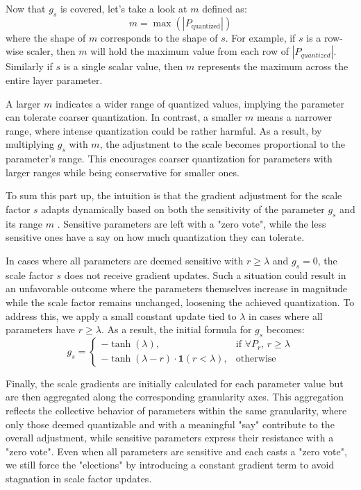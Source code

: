 Now that \( g_s \) is covered, let's take a look at \( m \) defined as:
\[
m = \max\left(\left| P_{\text{quantized}} \right|\right) 
\]
where the shape of \( m \) corresponds to the shape of \( s \).
For example, if \( s \) is a row-wise scaler, then \( m  \) will hold
the maximum value from each row of \( \left| P_{quantized} \right|\).
Similarly if  \( s \) is a single scalar value, then \( m \) represents
the maximum across the entire layer parameter.

A larger \( m \) indicates a wider range of quantized values,
implying the parameter can tolerate coarser quantization.
In contrast, a smaller \( m \) means a narrower range,
where intense quantization could be rather harmful.
As a result, by multiplying \( g_s\) with \( m \), 
the adjustment to the scale becomes proportional to the parameter's range.
This encourages coarser quantization for parameters with larger ranges
while being conservative for smaller ones.

To sum this part up, the intuition is that the gradient adjustment for the scale factor
\( s \) adapts dynamically based on both the sensitivity of the parameter  \( g_s\) 
and its range \( m \) . Sensitive parameters are left with a "zero vote",
while the less sensitive ones have a say on how much quantization they can tolerate.

In cases where all parameters are deemed sensitive with \( r \geq \lambda\) and
\( g_s =  0 \), the scale factor \(s\) does not receive gradient updates.
Such a situation could result in an unfavorable outcome
where the parameters themselves increase in magnitude while the scale factor remains unchanged,
loosening the achieved quantization.
To address this, we apply a small constant update tied to \( \lambda \) in cases where 
all parameters have \( r \geq \lambda\). As a result, the initial formula for \( g_s\) becomes:
\[
g_s = 
\begin{cases} 
- \tanh(\lambda), & \text{if } \forall P_r, \, r \geq \lambda \\
- \tanh(\lambda - r) \cdot \mathbf{1}(r < \lambda), & \text{otherwise}
\end{cases}
\]

Finally, the scale gradients are initially calculated for each parameter value
but are then aggregated along the corresponding granularity axes.
This aggregation reflects the collective behavior of parameters within the same granularity,
where only those deemed quantizable and with a meaningful "say" contribute to the overall adjustment,
while sensitive parameters express their resistance with a "zero vote".
Even when all parameters are sensitive and each casts a "zero vote", 
we still force the "elections" by introducing a constant gradient term
to avoid stagnation in scale factor updates.

